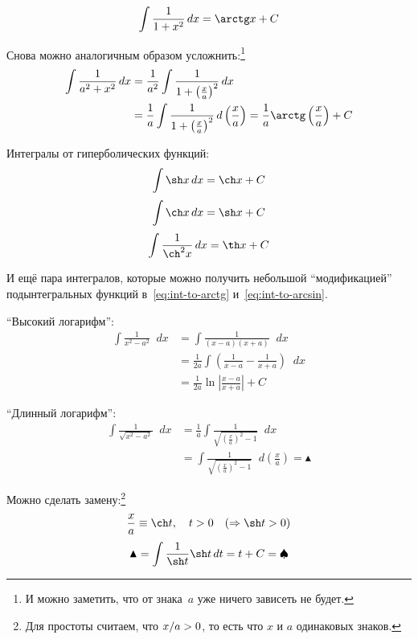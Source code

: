 \documentclass[a4paper,12pt]{article}
\newcommand{\diff}{\mathop{}\!d}
\begin{document}
  \[
    \int \frac{1}{1 + x^2} \diff x = \arctg x + C
  \]

  Снова можно аналогичным образом усложнить:\footnote{
    И можно заметить, что от знака~$a$ уже ничего зависеть не будет.
  }
  \begin{equation}
  \begin{split}\label{eq:int-to-arctg}
    \int \frac{1}{a^2 + x^2} \diff x
      &= \frac{1}{a^2} \int \frac{1}{1 + \left(\frac{x}{a}\right)^2} \diff x\\
      &= \frac{1}{a} \int \frac{1}{1 + \left(\frac{x}{a}\right)^2} \diff \left(\frac{x}{a}\right)
      = \frac{1}{a} \arctg\left(\frac{x}{a}\right) + C
  \end{split}
  \end{equation}

  Интегралы от гиперболических функций:
  \[
    \int \sh x \diff x = \ch x + C
  \]
  \[
    \int \ch x \diff x = \sh x + C
  \]
  \[
    \int \frac{1}{\ch^2 x} \diff x = \th x + C
  \]


  И ещё пара интегралов, которые можно получить небольшой ``модификацией'' подынтегральных функций в~\eqref{eq:int-to-arctg} и~\eqref{eq:int-to-arcsin}.

  ``Высокий логарифм'':
  \begin{equation}
  \begin{split}
    \int \frac{1}{x^2 - a^2} \diff x
      &= \int \frac{1}{(x - a)(x + a)} \diff x\\
      &= \frac{1}{2a} \int \left(\frac{1}{x - a} - \frac{1}{x + a}\right) \diff x\\
      &= \frac{1}{2a} \ln\left|\frac{x - a}{x + a}\right| + C
  \end{split}
  \end{equation}

  ``Длинный логарифм'':
  \begin{equation*}
  \begin{split}
    \int \frac{1}{\sqrt{x^2 - a^2}} \diff x
      &= \frac{1}{a} \int \frac{1}{\sqrt{\left(\frac{x}{a}\right)^2 - 1}} \diff x\\
      &= \int \frac{1}{\sqrt{\left(\frac{x}{a}\right)^2 - 1}} \diff\left(\frac{x}{a}\right) = \blacktriangle
  \end{split}
  \end{equation*}

  Можно сделать замену:\footnote{
    Для простоты считаем, что $x\hm/a \hm> 0$, то есть что $x$ и $a$ одинаковых знаков.
  }
  \[  %
      \frac{x}{a} \equiv \ch t,\quad t > 0\quad (\Rightarrow \sh t > 0)
  \]
  \[
    \blacktriangle = \int \frac{1}{\sh t} \sh t \diff t = t + C = \spadesuit
  \]
\end{document}
